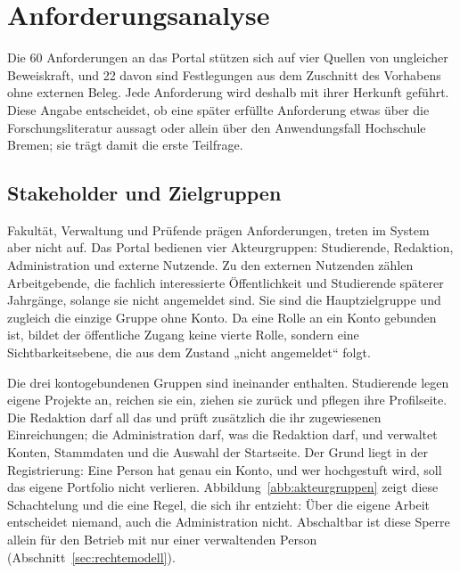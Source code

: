 
\chapter{Anforderungsanalyse}
\label{kap:anforderungsanalyse}

Die 60 Anforderungen an das Portal stützen sich auf vier Quellen von ungleicher Beweiskraft, und 22 davon sind Festlegungen aus dem Zuschnitt des Vorhabens ohne externen Beleg. Jede Anforderung wird deshalb mit ihrer Herkunft geführt. Diese Angabe entscheidet, ob eine später erfüllte Anforderung etwas über die Forschungsliteratur aussagt oder allein über den Anwendungsfall Hochschule Bremen; sie trägt damit die erste Teilfrage.

\section{Stakeholder und Zielgruppen}
\label{sec:stakeholder}

Fakultät, Verwaltung und Prüfende prägen Anforderungen, treten im System aber nicht auf. Das Portal bedienen vier Akteurgruppen: Studierende, Redaktion, Administration und externe Nutzende. Zu den externen Nutzenden zählen Arbeitgebende, die fachlich interessierte Öffentlichkeit und Studierende späterer Jahrgänge, solange sie nicht angemeldet sind. Sie sind die Hauptzielgruppe und zugleich die einzige Gruppe ohne Konto. Da eine Rolle an ein Konto gebunden ist, bildet der öffentliche Zugang keine vierte Rolle, sondern eine Sichtbarkeitsebene, die aus dem Zustand „nicht angemeldet“ folgt.

Die drei kontogebundenen Gruppen sind ineinander enthalten. Studierende legen eigene Projekte an, reichen sie ein, ziehen sie zurück und pflegen ihre Profilseite. Die Redaktion darf all das und prüft zusätzlich die ihr zugewiesenen Einreichungen; die Administration darf, was die Redaktion darf, und verwaltet Konten, Stammdaten und die Auswahl der Startseite. Der Grund liegt in der Registrierung: Eine Person hat genau ein Konto, und wer hochgestuft wird, soll das eigene Portfolio nicht verlieren. Abbildung~\ref{abb:akteurgruppen} zeigt diese Schachtelung und die eine Regel, die sich ihr entzieht: Über die eigene Arbeit entscheidet niemand, auch die Administration nicht. Abschaltbar ist diese Sperre allein für den Betrieb mit nur einer verwaltenden Person (Abschnitt~\ref{sec:rechtemodell}).

